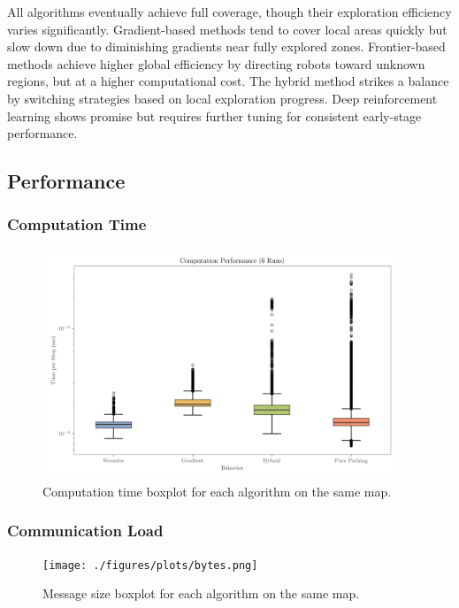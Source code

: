 All algorithms eventually achieve full coverage, though their exploration efficiency varies significantly. 
Gradient-based methods tend to cover local areas quickly but slow down due to diminishing gradients near fully explored zones. 
Frontier-based methods achieve higher global efficiency by directing robots toward unknown regions, but at a higher computational cost. The hybrid method strikes a balance by switching strategies based on local exploration progress. 
Deep reinforcement learning shows promise but requires further tuning for consistent early-stage performance.

\subsection{Performance}
\subsubsection{Computation Time}
\begin{figure}[H]
    \begin{center}
        \includegraphics[width=0.95\textwidth]{./figures/plots/computation-performance-(6-runs).png}
    \end{center}
    \caption{Computation time boxplot for each algorithm on the same map.}
    \label{fig:computation-performance}
\end{figure}

\subsubsection{Communication {\color{red}Load}}
\begin{figure}[H]
    \begin{center}
        \texttt{[image: ./figures/plots/bytes.png]}
    \end{center}
    \caption{Message size boxplot for each algorithm on the same map.}
    \label{fig:computation-performance}
\end{figure}
